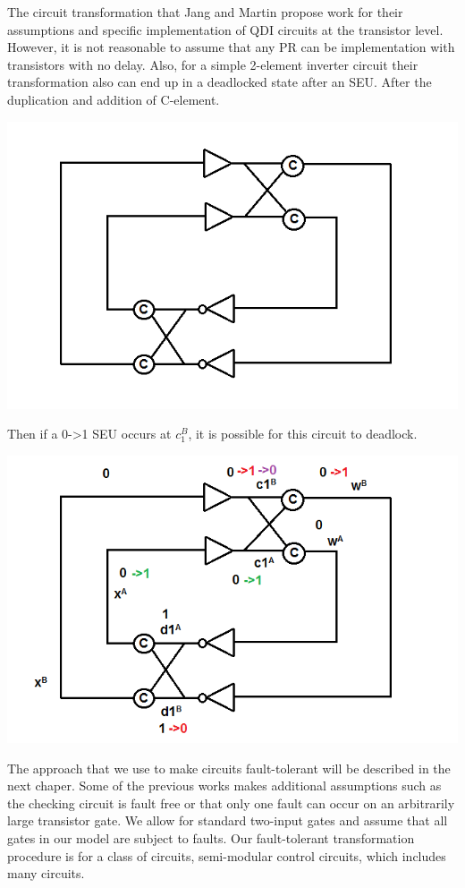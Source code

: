 \documentclass[12pt]{report}
\begin{document}
The circuit transformation that Jang and Martin propose work for their assumptions and specific implementation of QDI circuits at the transistor level. However, it is not reasonable to assume that any PR can be implementation with transistors with no delay. Also, for a simple 2-element inverter circuit their transformation also can end up in a deadlocked state after an SEU. After the duplication and addition of C-element. 
\begin{center}
\includegraphics[width=.7\textwidth]{transfex}
\end{center}
Then if a 0->1 SEU occurs at $c_1^B$, it is possible for this circuit to deadlock.
\begin{center}
\includegraphics[width=.7\textwidth]{transfexc}
\end{center}

The approach that we use to make circuits fault-tolerant will be described in the next chaper. Some of the previous works makes additional assumptions such as the checking circuit is fault free or that only one fault can occur on an arbitrarily large transistor gate. We allow for standard two-input gates and assume that all gates in our model are subject to faults. Our fault-tolerant transformation procedure is for a class of circuits, semi-modular control circuits, which includes many circuits.
\end{document}
